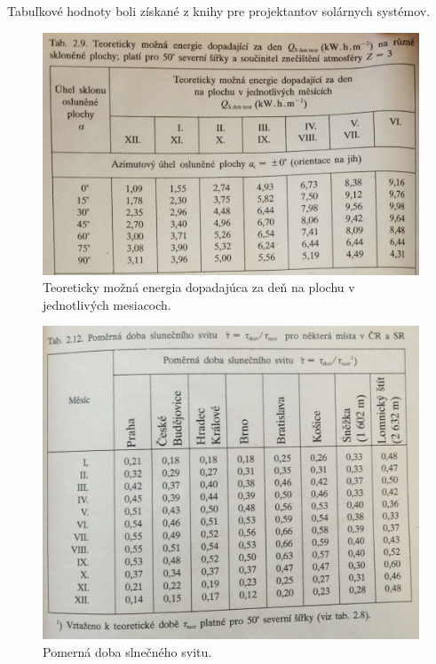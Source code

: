 \documentclass[a4paper, 11pt]{article}
\begin{document}
Tabuľkové hodnoty boli získané z knihy pre projektantov solárnych systémov\cite{Cihelka}.

\begin{figure}[H] 
\centering
\includegraphics[width=.6\paperwidth]{images/str34.jpg}
\caption{Teoreticky možná energia dopadajúca za deň na plochu v jednotlivých mesiacoch.}
\label{str34}
\end{figure}

\begin{figure}[H] 
\centering
\includegraphics[width=.6\paperwidth]{images/str41.jpg}
\caption{Pomerná doba slnečného svitu.}
\label{str41}
\end{figure}
\end{document}
